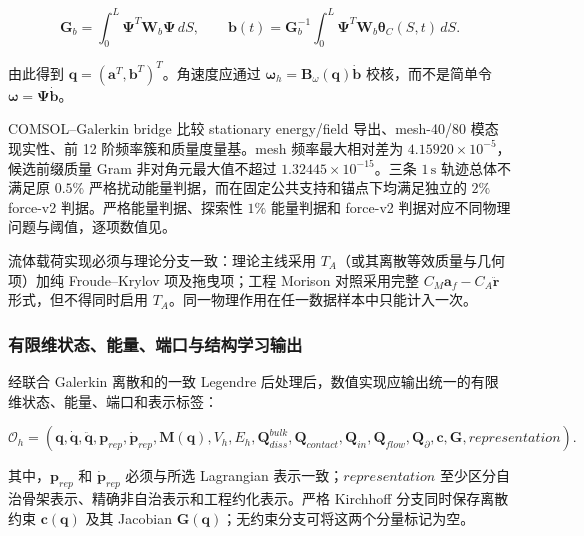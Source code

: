 \begin{equation}
\label{eq:galerkin-2-119}
\mathbf{G}_{b} = \int_{0}^{L}\bm{\Psi}^{T}\mathbf{W}_{b}\bm{\Psi}\, dS,\quad\quad\mathbf{b}(t) = \mathbf{G}_{b}^{- 1}\int_{0}^{L}\bm{\Psi}^{T}\mathbf{W}_{b}\bm{\theta}_{C}(S,t)\, dS.
\end{equation}

由此得到 \(\mathbf{q} = \left( \mathbf{a}^{T},\mathbf{b}^{T} \right)^{T}\)。角速度应通过 \(\bm{\omega}_{h} = \mathbf{B}_{\omega}\left( \mathbf{q} \right)\dot{\mathbf{b}}\) 校核，而不是简单令 \(\bm{\omega} = \bm{\Psi}\dot{\mathbf{b}}\)。

COMSOL--Galerkin bridge 比较 stationary energy/field 导出、mesh-40/80 模态现实性、前 12 阶频率簇和质量度量基。mesh 频率最大相对差为 \(4.15920\times10^{-5}\)，候选前缀质量 Gram 非对角元最大值不超过 \(1.32445\times10^{-15}\)。三条 \(1\,\mathrm{s}\) 轨迹总体不满足原 \(0.5\%\) 严格扰动能量判据，而在固定公共支持和锚点下均满足独立的 \(2\%\) force-v2 判据。严格能量判据、探索性 \(1\%\) 能量判据和 force-v2 判据对应不同物理问题与阈值，逐项数值见。

流体载荷实现必须与理论分支一致：理论主线采用 \(T_{A}\)（或其离散等效质量与几何项）加纯 Froude--Krylov 项及拖曳项；工程 Morison 对照采用完整 \(C_{M}\mathbf{a}_{f} - C_{A}\ddot{\mathbf{r}}\) 形式，但不得同时启用 \(T_{A}\)。同一物理作用在任一数据样本中只能计入一次。

\subsubsection{有限维状态、能量、端口与结构学习输出}\label{sec:galerkin-2-11-2}

经联合 Galerkin 离散和的一致 Legendre 后处理后，数值实现应输出统一的有限维状态、能量、端口和表示标签：

\begin{equation}
\label{eq:galerkin-2-120}
\mathcal{O}_{h} = \left( \mathbf{q},\dot{\mathbf{q}},\ddot{\mathbf{q}},\mathbf{p}_{rep},{\dot{\mathbf{p}}}_{rep},\mathbf{M}\left( \mathbf{q} \right),V_{h},E_{h},\mathbf{Q}_{diss}^{bulk},\mathbf{Q}_{contact},\mathbf{Q}_{in},\mathbf{Q}_{flow},\mathbf{Q}_{\partial},\mathbf{c},\mathbf{G},representation \right).
\end{equation}

其中，\(\mathbf{p}_{rep}\) 和 \({\dot{\mathbf{p}}}_{rep}\) 必须与所选 Lagrangian 表示一致；\(representation\) 至少区分自治骨架表示、精确非自治表示和工程约化表示。严格 Kirchhoff 分支同时保存离散约束 \(\mathbf{c}\left( \mathbf{q} \right)\) 及其 Jacobian \(\mathbf{G}\left( \mathbf{q} \right)\)；无约束分支可将这两个分量标记为空。

